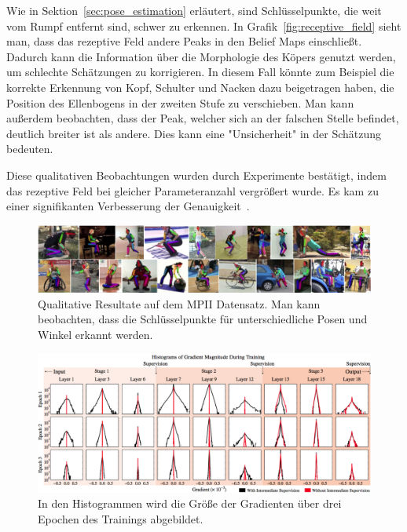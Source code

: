 \documentclass[journal, a4paper]{IEEEtran}
\begin{document}
        Wie in Sektion~\ref{sec:pose_estimation} erläutert, sind Schlüsselpunkte, die weit vom Rumpf entfernt sind, schwer zu erkennen. 
        In Grafik~\ref{fig:receptive_field} sieht man, dass das rezeptive Feld andere Peaks in den Belief Maps einschließt. Dadurch kann die Information über die Morphologie des Köpers genutzt werden, um schlechte Schätzungen zu korrigieren. In diesem Fall könnte zum Beispiel die korrekte Erkennung von Kopf, Schulter und Nacken dazu beigetragen haben, die Position des Ellenbogens in der zweiten Stufe zu verschieben. Man kann außerdem beobachten, dass der Peak, welcher sich an der falschen Stelle befindet, deutlich breiter ist als andere. Dies kann eine "Unsicherheit" in der Schätzung bedeuten.

        Diese qualitativen Beobachtungen wurden durch Experimente bestätigt, indem das rezeptive Feld bei gleicher Parameteranzahl vergrößert wurde. Es kam zu einer signifikanten Verbesserung der Genauigkeit~\cite{conv_pose}.

\begin{figure}
        \includegraphics[width=2\columnwidth]{mpii_results.png}
        \caption{Qualitative Resultate auf dem MPII Datensatz. Man kann beobachten, dass die Schlüsselpunkte für unterschiedliche Posen und Winkel erkannt werden.}
        \label{fig:mpii_results}
\end{figure}
\begin{figure}
        \includegraphics[width=2\columnwidth]{intermediate_supervision.png}
        \caption{In den Histogrammen wird die Größe der Gradienten über drei Epochen des Trainings abgebildet.}
        \label{fig:intermediate_supervision}
\end{figure}
\end{document}
